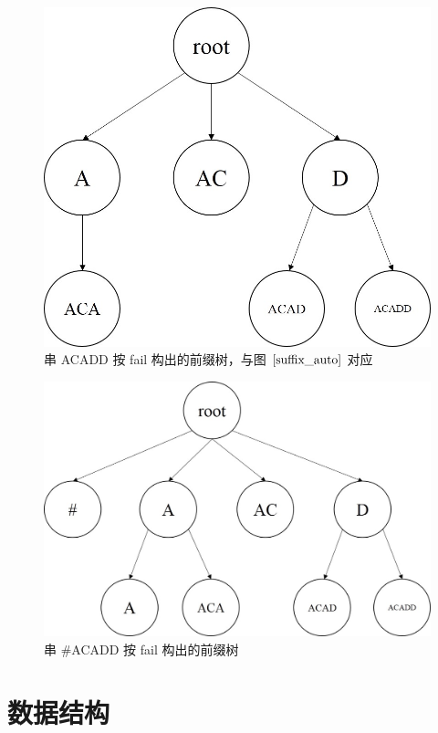 \documentclass{article}
\begin{document}
\begin{figure}
  \centering
  \includegraphics[scale=0.6]{suffix_auto2.jpg}
  \caption{串 ACADD 按 fail 构出的前缀树，与图 $\ref{suffix_auto}$ 对应}
  \label{suffix_auto2}
\end{figure}


\begin{figure}
  \centering
  \includegraphics[scale=0.6]{suffix_auto3.jpg}
  \caption{串 \#ACADD 按 fail 构出的前缀树}
  \label{suffix_auto3}
\end{figure}

\section{数据结构}
\end{document}

